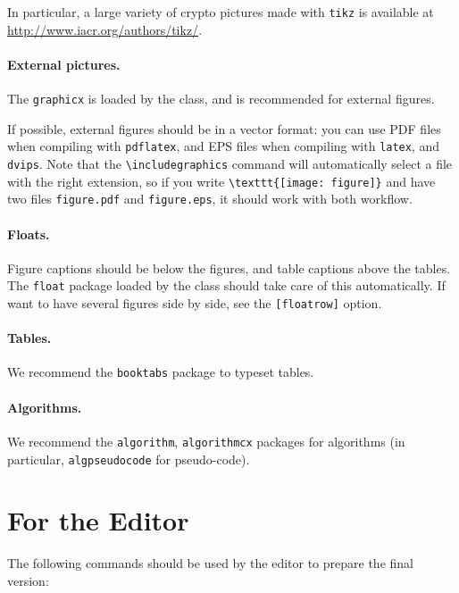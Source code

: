 \documentclass{iacrcc}
\begin{document}
In particular, a large variety of crypto pictures made with
\texttt{tikz} is available at \url{http://www.iacr.org/authors/tikz/}.

\paragraph{External pictures.}  The \texttt{graphicx} is loaded by the
class, and is recommended for external figures.

If possible, external figures should be in a vector format: you can
use PDF files when compiling with \texttt{pdflatex}, and EPS files
when compiling with \texttt{latex}, and \texttt{dvips}.  Note that the
\verb+\includegraphics+ command will automatically select a file with
the right extension, so if you write \verb+\texttt{[image: figure]}+
and have two files \texttt{figure.pdf} and \texttt{figure.eps}, it
should work with both workflow.

\paragraph{Floats.}

Figure captions should be below the figures, and table captions above
the tables.  The \texttt{float} package loaded by the class should
take care of this automatically.  If want to have several figures side
by side, see the \texttt{[floatrow]} option.

\paragraph{Tables.}

We recommend the \texttt{booktabs} package to typeset tables.

\paragraph{Algorithms.}

We recommend the \texttt{algorithm}, \texttt{algorithmcx} packages for
algorithms (in particular, \texttt{algpseudocode} for pseudo-code).


\section{For the Editor}

The following commands should be used by the editor to prepare the final
version:
\end{document}
